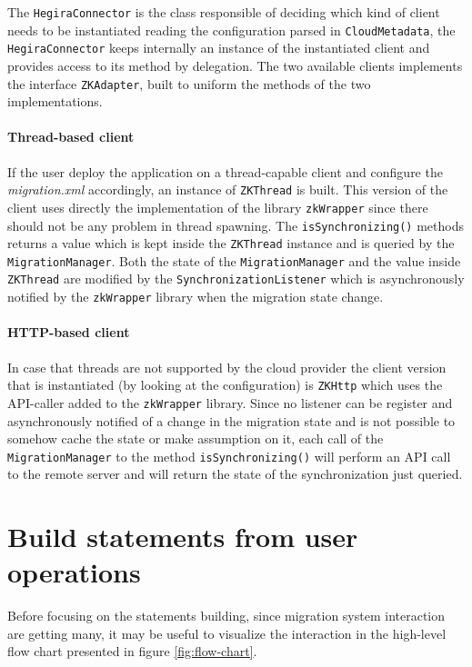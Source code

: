 \noindent The \texttt{HegiraConnector} is the class responsible of deciding which kind of client needs to be instantiated reading the configuration parsed  in \texttt{CloudMetadata}, the \texttt{HegiraConnector}  keeps internally an instance of the instantiated client and provides access to its method by delegation.
The two available clients implements the interface \texttt{ZKAdapter}, built to uniform the methods of the two implementations.

\paragraph{Thread-based client} If the user deploy the application on a thread-capable client and configure the \textit{migration.xml} accordingly, an instance of \texttt{ZKThread} is built. This version of the client uses directly the implementation of the library \texttt{zkWrapper} since there should not be any problem in thread spawning.
The \texttt{isSynchronizing()} methods returns a value which is kept inside the \texttt{ZKThread} instance and is queried by the \texttt{MigrationManager}.
Both the state of the \texttt{MigrationManager} and the value inside \texttt{ZKThread} are modified by the \texttt{SynchronizationListener} which is asynchronously notified by the \texttt{zkWrapper} library when the migration state change.

\paragraph{HTTP-based client} In case that threads are not supported by the cloud provider the client version that is instantiated (by looking at the configuration) is \texttt{ZKHttp} which uses the API-caller added to the \texttt{zkWrapper} library.
Since no listener can be register and asynchronously notified of a change in the migration state and is not possible to somehow cache the state or make assumption on it, each call of the \texttt{MigrationManager} to the method \texttt{isSynchronizing()} will perform an API call to the remote server and will return the state of the synchronization just queried.

\section{Build statements from user operations}
\label{sec:statements}
Before focusing on the statements building, since migration system interaction are getting many, it may be useful to visualize the interaction in the high-level flow chart presented in figure \ref{fig:flow-chart}.

